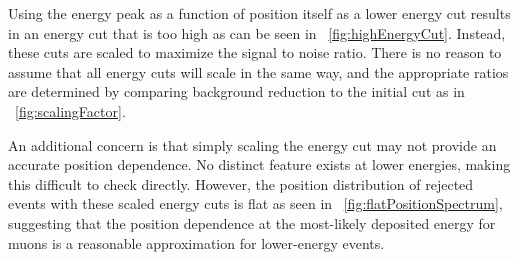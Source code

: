 Using the energy peak as a function of position itself as a lower energy cut results in an energy cut that is too high as can be seen in {\fig}~\ref{fig:highEnergyCut}.  Instead, these cuts are scaled to maximize the signal to noise ratio.  There is no reason to assume that all energy cuts will scale in the same way, and the appropriate ratios are determined by comparing background reduction to the initial cut as in {\fig}~\ref{fig:scalingFactor}.  
\begin{figure}[!htbp]
\centering
{}
\hspace{8pt}
\caption{}
\label{fig:scalingFactorEffect}
\end{figure}
An additional concern is that simply scaling the energy cut may not provide an accurate position dependence.  No distinct feature exists at lower energies, making this difficult to check directly.  However, the position distribution of rejected events with these scaled energy cuts is flat as seen in {\fig}~\ref{fig:flatPositionSpectrum}, suggesting that the position dependence at the most-likely deposited energy for muons is a reasonable approximation for lower-energy events.
